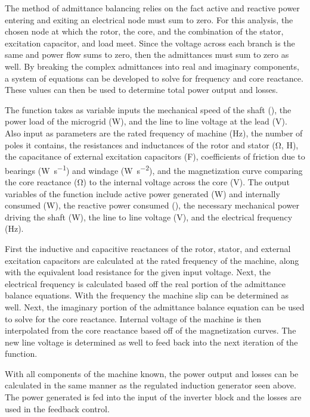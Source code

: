 The method of admittance balancing relies on the fact active and reactive power entering and exiting an electrical node must sum to zero. For this analysis, the chosen node at which the rotor, the core, and the combination of the stator, excitation capacitor, and load meet. Since the voltage across each branch is the same and power flow sums to zero, then the admittances must sum to zero as well. By breaking the complex admittances into real and imaginary components, a system of equations can be developed to solve for frequency and core reactance. 
These values can then be used to determine total power output and losses. 

The function takes as variable inputs the mechanical speed of the shaft (\si{\rpm}), the power load of the microgrid (\si{\watt}), and the line to line voltage at the lead (\si{\volt}). Also input as parameters are the rated frequency of machine (\si{\hertz}), the number of poles it contains, the resistances and inductances of the rotor and stator (\si{\ohm}, \si{\henry}), the capacitance of external excitation capacitors (\si{\farad}), coefficients of friction due to bearings (\si{\watt\per\second}) and windage (\si{\watt\per\second\squared}), and the magnetization curve comparing the core reactance (\si{\ohm}) to the internal voltage across the core (\si{\volt}). The output variables of the function include active power generated (\si{\watt}) and internally consumed (\si{\watt}), the reactive power consumed (\si{\voltampreactive}), the necessary mechanical power driving the shaft (\si{\watt}), the line to line voltage (\si{\volt}), and the electrical frequency (\si{\hertz}).

First the inductive and capacitive reactances of the rotor, stator, and external excitation capacitors are calculated at the rated frequency of the machine, along with the equivalent load resistance for the given input voltage. Next, the electrical frequency is calculated based off the real portion of the admittance balance equations. With the frequency the machine slip can be determined as well. Next, the imaginary portion of the admittance balance equation can be used to solve for the core reactance. Internal voltage of the machine is then interpolated from the core reactance based off of the magnetization curves. The new line voltage is determined as well to feed back into the next iteration of the function.

With all components of the machine known, the power output and losses can be calculated in the same manner as the regulated induction generator seen above. The power generated is fed into the input of the inverter block and the losses are used in the feedback control.

